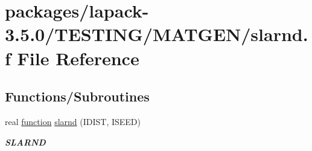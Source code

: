 \hypertarget{slarnd_8f}{}\section{packages/lapack-\/3.5.0/\+T\+E\+S\+T\+I\+N\+G/\+M\+A\+T\+G\+E\+N/slarnd.f File Reference}
\label{slarnd_8f}
\subsection*{Functions/\+Subroutines}
\begin{DoxyCompactItemize}
\item 
real \hyperlink{afunc_8m_a7b5e596df91eadea6c537c0825e894a7}{function} \hyperlink{group__real__matgen_ga8e2f5b9ec00d7322280f3029242aadec}{slarnd} (I\+D\+I\+S\+T, I\+S\+E\+E\+D)
\begin{DoxyCompactList}\small\item\em {\bfseries S\+L\+A\+R\+N\+D} \end{DoxyCompactList}\end{DoxyCompactItemize}
